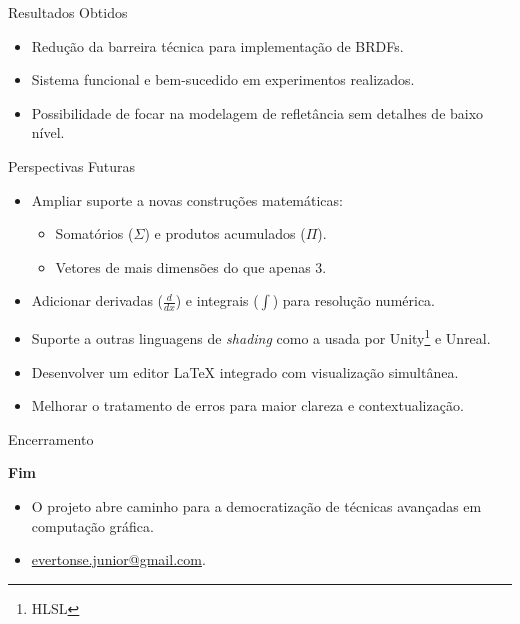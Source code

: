 \begin{frame}{Resultados Obtidos}
    \begin{itemize}
        \item Redução da barreira técnica para implementação de BRDFs.
        \item Sistema funcional e bem-sucedido em experimentos realizados.
        \item Possibilidade de focar na modelagem de refletância sem detalhes de baixo nível.
    \end{itemize}
\end{frame}

\begin{frame}{Perspectivas Futuras}
    \begin{itemize}
        \item Ampliar suporte a novas construções matemáticas:
        \begin{itemize}
            \item Somatórios ($\Sigma$) e produtos acumulados ($\Pi$).
            \item Vetores de mais dimensões do que apenas 3.
        \end{itemize}
    \item Adicionar derivadas ($\frac{d}{dx}$) e integrais ($\int$) para resolução numérica.
    \item Suporte a outras linguagens de \textit{shading} como a usada por Unity\footnote{HLSL} e Unreal.
    \item Desenvolver um editor \LaTeX{} integrado com visualização simultânea.
    \item Melhorar o tratamento de erros para maior clareza e contextualização.
    \end{itemize}
\end{frame}

\begin{frame}{Encerramento}
    \begin{center}
        \textbf{\Huge Fim}
    \end{center}
    \begin{itemize}
        \item O projeto abre caminho para a democratização de técnicas avançadas em computação gráfica.
        \item\href{mailto:evertonse.junior@gmail.com}{evertonse.junior@gmail.com}.
    \end{itemize}
\end{frame}

